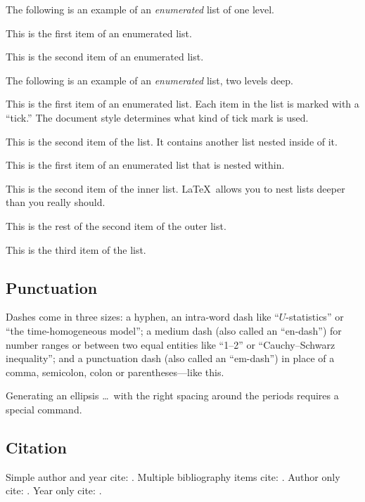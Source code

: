 \documentclass[aoas]{imsart}
\theoremstyle{plain}
\theoremstyle{definition}
\begin{document}
The following is an example of an \emph{enumerated} list of one level.

\begin{longlist}
\item This is the first item of an enumerated list.
\item This is the second item of an enumerated list.
\end{longlist}

The following is an example of an \emph{enumerated} list, two levels deep.
\begin{longlist}
\item[1.]
This is the first item of an enumerated list.  Each item
in the list is marked with a ``tick.''  The document
style determines what kind of tick mark is used.
\item[2.]
This is the second item of the list.  It contains another
list nested inside of it.
\begin{longlist}
\item
This is the first item of an enumerated list that
is nested within.
\item
This is the second item of the inner list.  \LaTeX\
allows you to nest lists deeper than you really should.
\end{longlist}
This is the rest of the second item of the outer list.
\item[3.]
This is the third item of the list.
\end{longlist}

\subsection{Punctuation}
Dashes come in three sizes: a hyphen, an intra-word dash like ``$U$-statistics'' or ``the time-homogeneous model'';
a medium dash (also called an ``en-dash'') for number ranges or between two equal entities like ``1--2'' or ``Cauchy--Schwarz inequality'';
and a punctuation dash (also called an ``em-dash'') in place of a comma, semicolon,
colon or parentheses---like this.

Generating an ellipsis \ldots\ with the right spacing
around the periods requires a special command.

\subsection{Citation}

Simple author and year cite: \cite{r1}.
Multiple bibliography items cite: \cite{r1,r2}.
Author only cite: \citeauthor{r3}.
Year only cite: \citeyear{r4}.
\end{document}
